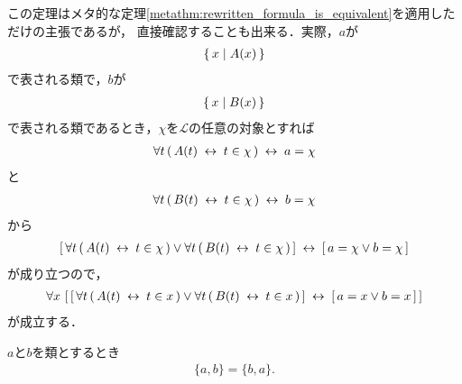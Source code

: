 	この定理はメタ的な定理\ref{metathm:rewritten_formula_is_equivalent}を適用しただけの主張であるが，
	直接確認することも出来る．実際，$a$が
	\begin{align}
		\left\{\, x \mid A(x)\, \right\}
	\end{align}
	で表される類で，$b$が
	\begin{align}
		\left\{\, x \mid B(x)\, \right\}
	\end{align}
	で表される類であるとき，$\chi$を$\mathcal{L}$の任意の対象とすれば
	\begin{align}
		\forall t\, (\, A(t) \hspace{0.25em}\leftrightarrow\hspace{0.25em} t \in \chi\, ) \hspace{0.25em}\leftrightarrow\hspace{0.25em} a = \chi
	\end{align}
	と
	\begin{align}
		\forall t\, (\, B(t) \hspace{0.25em}\leftrightarrow\hspace{0.25em} t \in \chi\, ) \hspace{0.25em}\leftrightarrow\hspace{0.25em} b = \chi
	\end{align}
	から
	\begin{align}
		\left[\, \forall t\, (\, A(t) \hspace{0.25em}\leftrightarrow\hspace{0.25em} t \in \chi\, ) \vee
		\forall t\, (\, B(t) \hspace{0.25em}\leftrightarrow\hspace{0.25em} t \in \chi\, )\, \right]
		\hspace{0.25em}\leftrightarrow\hspace{0.25em}
		\left[\, a = \chi \vee b = \chi\, \right]
	\end{align}
	が成り立つので，
	\begin{align}
		\forall x\, \left[\, \left[\, \forall t\, (\, A(t) \hspace{0.25em}\leftrightarrow\hspace{0.25em} t \in x\, ) \vee
		\forall t\, (\, B(t) \hspace{0.25em}\leftrightarrow\hspace{0.25em} t \in x\, )\, \right]
		\hspace{0.25em}\leftrightarrow\hspace{0.25em}
		\left[\, a = x \vee b = x\, \right]\, \right]
	\end{align}
	が成立する．
	
	\begin{screen}
		\begin{thm}[要素の表示の順番を入れ替えても対は等しい]\label{thm:commutative_law_of_pairs}
			$a$と$b$を類とするとき
			\begin{align}
				\{a,b\} = \{b,a\}.
			\end{align}
		\end{thm}
	\end{screen}
	
